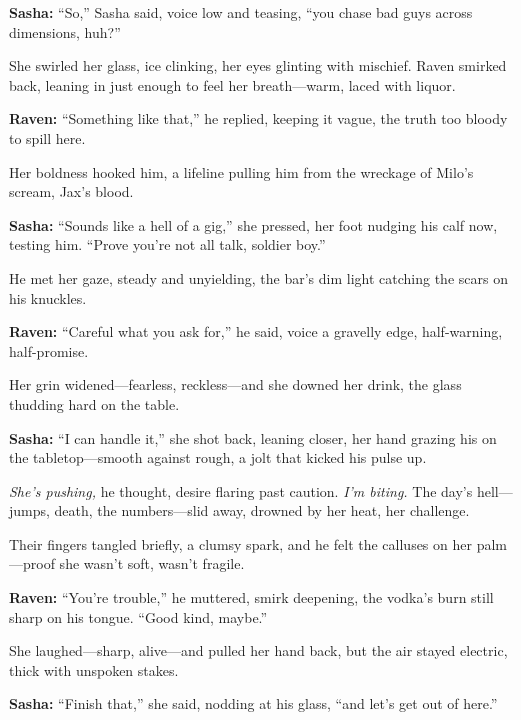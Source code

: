 \documentclass[12pt]{book}
\begin{document}
\vspace{0.5em}
\textbf{Sasha:} “So,” Sasha said, voice low and teasing, “you chase bad guys across dimensions, huh?”

She swirled her glass, ice clinking, her eyes glinting with mischief. Raven smirked back, leaning in just enough to feel her breath—warm, laced with liquor.

\vspace{0.5em}
\textbf{Raven:} “Something like that,” he replied, keeping it vague, the truth too bloody to spill here.

Her boldness hooked him, a lifeline pulling him from the wreckage of Milo’s scream, Jax’s blood.

\vspace{0.5em}
\textbf{Sasha:} “Sounds like a hell of a gig,” she pressed, her foot nudging his calf now, testing him. “Prove you’re not all talk, soldier boy.”

He met her gaze, steady and unyielding, the bar’s dim light catching the scars on his knuckles.

\vspace{0.5em}
\textbf{Raven:} “Careful what you ask for,” he said, voice a gravelly edge, half-warning, half-promise.

Her grin widened—fearless, reckless—and she downed her drink, the glass thudding hard on the table.

\vspace{0.5em}
\textbf{Sasha:} “I can handle it,” she shot back, leaning closer, her hand grazing his on the tabletop—smooth against rough, a jolt that kicked his pulse up.

\textit{She’s pushing,} he thought, desire flaring past caution. \textit{I’m biting.} The day’s hell—jumps, death, the numbers—slid away, drowned by her heat, her challenge.

Their fingers tangled briefly, a clumsy spark, and he felt the calluses on her palm—proof she wasn’t soft, wasn’t fragile.

\vspace{0.5em}
\textbf{Raven:} “You’re trouble,” he muttered, smirk deepening, the vodka’s burn still sharp on his tongue. “Good kind, maybe.”

She laughed—sharp, alive—and pulled her hand back, but the air stayed electric, thick with unspoken stakes.

\vspace{0.5em}
\textbf{Sasha:} “Finish that,” she said, nodding at his glass, “and let’s get out of here.”
\end{document}

